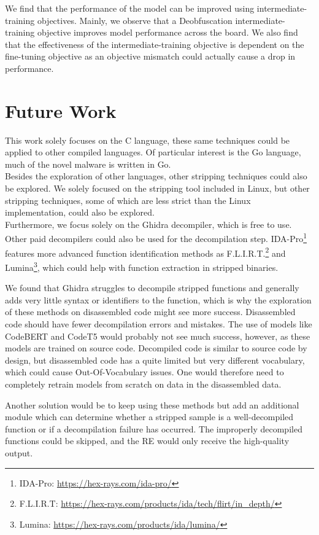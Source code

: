 We find that the performance of the model can be improved using intermediate-training objectives. Mainly, we observe that a Deobfuscation intermediate-training objective improves model performance across the board. We also find that the effectiveness of the intermediate-training objective is dependent on the fine-tuning objective as an objective mismatch could actually cause a drop in performance.

\section{Future Work}
This work solely focuses on the C language, these same techniques could be applied to other compiled languages. Of particular interest is the Go language, much of the novel malware is written in Go.\\
Besides the exploration of other languages, other stripping techniques could also be explored. We solely focused on the stripping tool included in Linux, but other stripping techniques, some of which are less strict than the Linux implementation, could also be explored.\\

Furthermore, we focus solely on the Ghidra decompiler, which is free to use. Other paid decompilers could also be used for the decompilation step. IDA-Pro\footnote{IDA-Pro: \url{https://hex-rays.com/ida-pro/}} features more advanced function identification methods as F.L.I.R.T.\footnote{F.L.I.R.T: \url{https://hex-rays.com/products/ida/tech/flirt/in_depth/}} and Lumina\footnote{Lumina: \url{https://hex-rays.com/products/ida/lumina/}}, which could help with function extraction in stripped binaries.

We found that Ghidra struggles to decompile stripped functions and generally adds very little syntax or identifiers to the function, which is why the exploration of these methods on disassembled code might see more success. Disassembled code should have fewer decompilation errors and mistakes. The use of models like CodeBERT and CodeT5 would probably not see much success, however, as these models are trained on source code. Decompiled code is similar to source code by design, but disassembled code has a quite limited but very different vocabulary, which could cause Out-Of-Vocabulary issues. One would therefore need to completely retrain models from scratch on data in the disassembled data.

Another solution would be to keep using these methods but add an additional module which can determine whether a stripped sample is a well-decompiled function or if a decompilation failure has occurred. The improperly decompiled functions could be skipped, and the RE would only receive the high-quality output.

